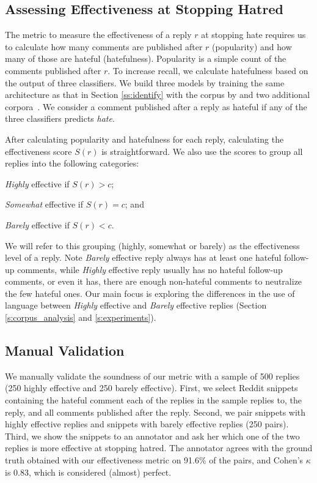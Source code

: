\documentclass[11pt]{article}
\begin{document}
\subsection{Assessing Effectiveness at Stopping Hatred}
\label{ss:assess}
The metric to measure the effectiveness of a reply $r$ at stopping hate requires us to calculate
how many comments are published after $r$ (popularity)
and how many of those are hateful (hatefulness).
Popularity is a simple count of the comments published after $r$.
To increase recall, we calculate hatefulness based on the output of three classifiers.
We build three models by training the same architecture as that in Section \ref{ss:identify} with the corpus by \citet{qian-etal-2019-benchmark}
and two additional corpora~\cite{hateoffensive,vidgen-etal-2021-introducing}.
We consider a comment published after a reply as hateful if any of the three classifiers predicts \emph{hate}. 


After calculating popularity and hatefulness for each reply,
calculating the effectiveness score $S(r)$ is straightforward.
We also use the scores to group all replies into the following categories:
\begin{compactitem}
	\item \emph{Highly} effective if $S(r) > c$;
	\item \emph{Somewhat} effective if $S(r) = c$; and
	\item \emph{Barely} effective if $S(r) < c$.
\end{compactitem}

We will refer to this grouping (highly, somewhat or barely) as the effectiveness level of a reply.
Note \emph{Barely} effective reply always has at least one hateful follow-up comments, 
while
\emph{Highly} effective reply usually has no hateful follow-up comments, or even it has, there are enough non-hateful comments to neutralize the few hateful ones.
Our main focus is exploring the differences in the use of language between \emph{Highly} effective and \emph{Barely} effective replies (Section \ref{s:corpus_analysis} and \ref{s:experiments}).

\subsection{Manual Validation}
We manually validate the soundness of our metric with a sample of 500 replies (250 highly effective and 250 barely effective).
First, we select Reddit snippets containing
the hateful comment each of the replies in the sample replies to,
the reply,
and all comments published after the reply.
Second, we pair snippets with highly effective replies and snippets with barely effective replies (250 pairs).
Third, we show the snippets to an annotator
and ask her which one of the two replies is more effective at stopping hatred.
The annotator agrees with the ground truth obtained with our effectiveness metric on 91.6\% of the pairs,
and Cohen's $\kappa$ is 0.83, which is considered (almost) perfect.
\end{document}
